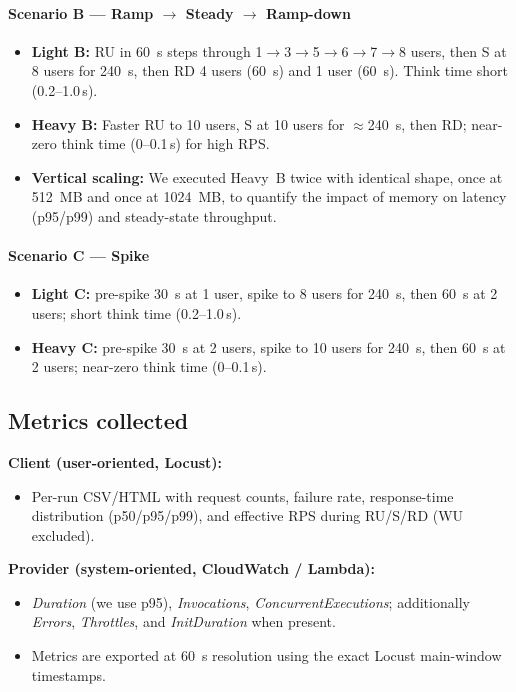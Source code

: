 \documentclass[11pt,a4paper]{article}
\begin{document}
\paragraph{Scenario B — Ramp $\rightarrow$ Steady $\rightarrow$ Ramp-down}
\begin{itemize}
  \item \textbf{Light B:} RU in \SI{60}{s} steps through 1$\rightarrow$3$\rightarrow$5$\rightarrow$6$\rightarrow$7$\rightarrow$8 users, then S at 8 users for \SI{240}{s}, then RD 4 users (\SI{60}{s}) and 1 user (\SI{60}{s}). Think time short (0.2–1.0\,s).
  \item \textbf{Heavy B:} Faster RU to 10 users, S at 10 users for $\approx$\SI{240}{s}, then RD; near-zero think time (0–0.1\,s) for high RPS.
  \item \textbf{Vertical scaling:} We executed Heavy~B twice with identical shape, once at \SI{512}{MB} and once at \SI{1024}{MB}, to quantify the impact of memory on latency (p95/p99) and steady-state throughput.
\end{itemize}

\paragraph{Scenario C — Spike}
\begin{itemize}
  \item \textbf{Light C:} pre-spike \SI{30}{s} at 1 user, spike to 8 users for \SI{240}{s}, then \SI{60}{s} at 2 users; short think time (0.2–1.0\,s).
  \item \textbf{Heavy C:} pre-spike \SI{30}{s} at 2 users, spike to 10 users for \SI{240}{s}, then \SI{60}{s} at 2 users; near-zero think time (0–0.1\,s).
\end{itemize}

\subsection{Metrics collected}
\textbf{Client (user-oriented, Locust):}
\begin{itemize}
  \item Per-run CSV/HTML with request counts, failure rate, response-time distribution (p50/p95/p99), and effective RPS during RU/S/RD (WU excluded).
\end{itemize}
\textbf{Provider (system-oriented, CloudWatch / Lambda):}
\begin{itemize}
  \item \emph{Duration} (we use p95), \emph{Invocations}, \emph{ConcurrentExecutions}; additionally \emph{Errors}, \emph{Throttles}, and \emph{InitDuration} when present.
  \item Metrics are exported at \SI{60}{s} resolution using the exact Locust main-window timestamps.
\end{itemize}
\end{document}
